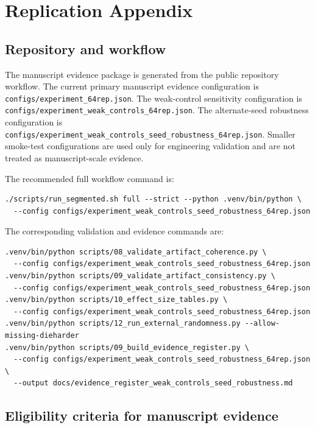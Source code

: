 
\appendix
\section{Replication Appendix}
\label{app:replication}

\subsection{Repository and workflow}
\label{app:repository-workflow}

The manuscript evidence package is generated from the public repository workflow. The current primary manuscript evidence configuration is \texttt{configs/experiment\_64rep.json}. The weak-control sensitivity configuration is \texttt{configs/experiment\_weak\_controls\_64rep.json}. The alternate-seed robustness configuration is \texttt{configs/experiment\_weak\_controls\_seed\_robustness\_64rep.json}. Smaller smoke-test configurations are used only for engineering validation and are not treated as manuscript-scale evidence.

The recommended full workflow command is:

\begin{verbatim}
./scripts/run_segmented.sh full --strict --python .venv/bin/python \
  --config configs/experiment_weak_controls_seed_robustness_64rep.json
\end{verbatim}

The corresponding validation and evidence commands are:

\begin{verbatim}
.venv/bin/python scripts/08_validate_artifact_coherence.py \
  --config configs/experiment_weak_controls_seed_robustness_64rep.json
.venv/bin/python scripts/09_validate_artifact_consistency.py \
  --config configs/experiment_weak_controls_seed_robustness_64rep.json
.venv/bin/python scripts/10_effect_size_tables.py \
  --config configs/experiment_weak_controls_seed_robustness_64rep.json
.venv/bin/python scripts/12_run_external_randomness.py --allow-missing-dieharder
.venv/bin/python scripts/09_build_evidence_register.py \
  --config configs/experiment_weak_controls_seed_robustness_64rep.json \
  --output docs/evidence_register_weak_controls_seed_robustness.md
\end{verbatim}

\subsection{Eligibility criteria for manuscript evidence}
\label{app:evidence-eligibility}

